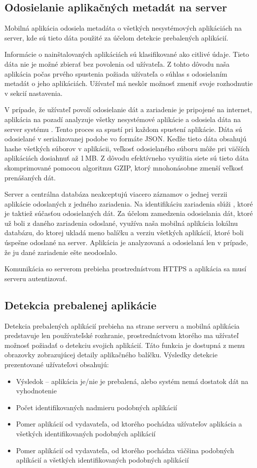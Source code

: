 \subsection{Odosielanie aplikačných metadát na server}
Mobilná aplikácia odosiela metadáta o všetkých nesystémových aplikáciách na server, kde sú tieto dáta použité za účelom detekcie prebalených aplikácií.

Informácie o nainštalovaných aplikáciách sú klasifikované ako citlivé údaje. Tieto dáta nie je možné zbierať bez povolenia od užívateľa. Z tohto dôvodu naša aplikácia počas prvého spustenia požiada užívateľa o súhlas s odosielaním metadát o jeho aplikáciách. Užívateľ má neskôr možnosť zmeniť svoje rozhodnutie v sekcií nastavenia.

V prípade, že užívateľ povolí odosielanie dát a zariadenie je pripojené na internet, aplikácia na pozadí analyzuje všetky nesystémové aplikácie a odosiela dáta na server systému . Tento proces sa spustí pri každom spustení aplikácie. Dáta sú odosielané v serializovanej podobe vo formáte JSON. Keďže tieto dáta obsahujú hashe všetkých súborov v aplikácii, veľkosť odosielaného súboru môže pri väčších aplikáciách dosiahnuť až 1\,MB. Z dôvodu efektívneho využitia siete sú tieto dáta skomprimované pomocou algoritmu GZIP, ktorý mnohonásobne zmenší veľkosť prenášaných dát.

Server a centrálna databáza neakceptujú viacero záznamov o jednej verzii aplikácie odoslaných z jedného zariadenia. Na identifikáciu zariadenia slúži , ktoré je taktiež súčasťou odosielaných dát. Za účelom zamedzenia odosielania dát, ktoré už boli z daného zariadenia odoslané, využíva naša mobilná aplikácia lokálnu databázu, do ktorej ukladá meno balíčku a verziu všetkých aplikácií, ktoré boli úspešne odoslané na server. Aplikácia je analyzovaná a odosielaná len v prípade, že ju dané zariadenie ešte neodoslalo.

Komunikácia so serverom prebieha prostrednístvom HTTPS a aplikácia sa musí serveru autentizovať.

\subsection{Detekcia prebalenej aplikácie}
Detekcia prebalených aplikácií prebieha na strane serveru a mobilná aplikácia predstavuje len používateľské rozhranie, prostredníctvom ktorého ma užívateľ možnosť požiadať o detekciu svojich aplikácií. Táto funkcia je dostupná z menu obrazovky zobrazujúcej detaily aplikačného balíčku. Výsledky detekcie prezentované užívateľovi obsahujú:
\begin{itemize}
\item Výsledok -- aplikácia je/nie je prebalená, alebo systém nemá dostatok dát na vyhodnotenie
	\item Počet identifikovaných nadmieru podobných aplikácií
	\item Pomer aplikácií od vydavateľa, od ktorého pochádza užívateľov aplikácia a všetkých identifikovaných podobných aplikácií
	\item Pomer aplikácií od vydavateľa, od ktorého pochádza väčšina podobných aplikácií a všetkých identifikovaných podobných aplikácií
\end{itemize}
	
	
